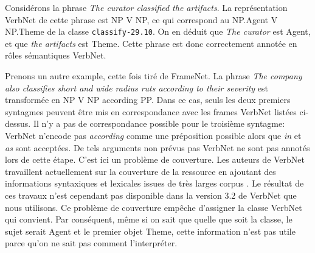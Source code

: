 Considérons la phrase \emph{The curator classified the artifacts}. La
représentation VerbNet de cette phrase est NP V NP, ce qui correspond au
NP.Agent V NP.Theme de la classe \texttt{classify-29.10}. On en déduit que
\emph{The curator} est Agent, et que \emph{the artifacts} est Theme. Cette
phrase est donc correctement annotée en rôles sémantiques VerbNet.

Prenons un autre example, cette fois tiré de FrameNet. La phrase \emph{The
company also classifies short and wide radius ruts according to their severity}
est transformée en NP V NP according PP. Dans ce cas, seuls les deux premiers
syntagmes peuvent être mis en correspondance avec les frames VerbNet listées
ci-dessus. Il n'y a pas de correspondance possible pour le troisième syntagme:
VerbNet n'encode pas \emph{according} comme une préposition possible alors que
\emph{in} et \emph{as} sont acceptées. De tels arguments non prévus pas VerbNet
ne sont pas annotés lors de cette étape. C'est ici un problème de couverture.
Les auteurs de VerbNet travaillent actuellement sur la couverture de la
ressource en ajoutant des informations syntaxiques et lexicales issues de très
larges corpus \citep{bonial2013expanding}. Le résultat de ces travaux n'est
cependant pas disponible dans la version 3.2 de VerbNet que nous utilisons. Ce
problème de couverture empêche d'assigner la classe VerbNet qui convient. Par
conséquent, même si on sait que quelle que soit la classe, le sujet serait
Agent et le premier objet Theme, cette information n'est pas utile parce qu'on
ne sait pas comment l'interpréter.





